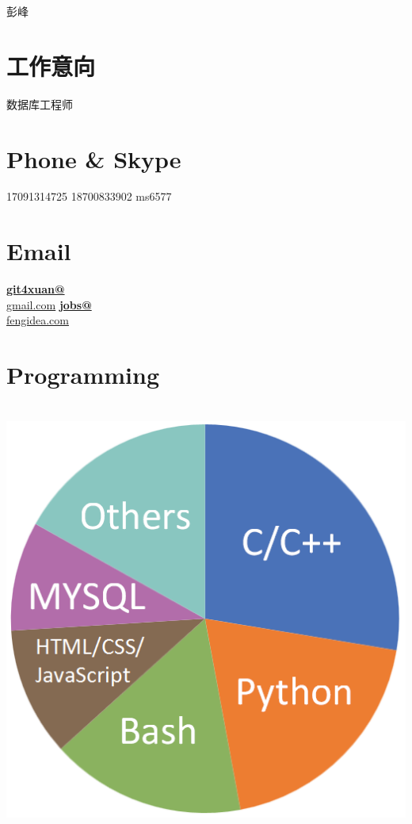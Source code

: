 \documentclass[]{friggeri-cv}
\begin{document}
      { 彭峰 } 



\begin{aside}
  \section{工作意向}
    数据库工程师
    ~
  \section{Phone \& Skype}
    17091314725
    18700833902
    ms6577
    ~
  \section{Email}
    \href{mailto:git4xuan@gmail.com}{\textbf{git4xuan@}\\gmail.com}
    \href{mailto:jobs@fengidea.com}{\textbf{jobs@}\\fengidea.com}
    ~
    ~
  \section{Programming}
  ~
    \includegraphics[scale=0.25]{img/programming3.png}
    ~

\end{aside}
\end{document}
